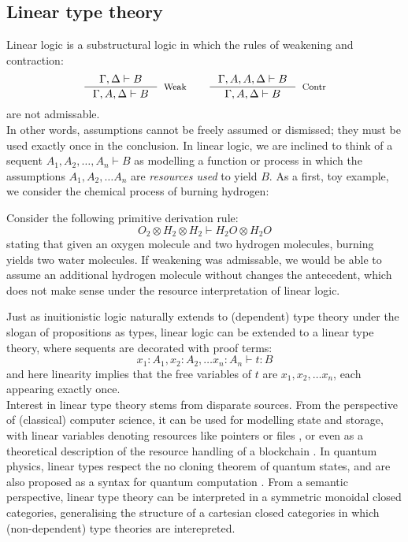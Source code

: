 \subsection{Linear type theory}
Linear logic is a substructural logic in which the rules of weakening and contraction:
\[
  \begin{split}
    \inference{\Gamma, \Delta \vdash B}{\Gamma, A, \Delta \vdash B}[Weak] \quad \quad 
    \inference{\Gamma, A, A, \Delta \vdash B}{\Gamma, A, \Delta \vdash B}[Contr]
    \end{split}
\]
are not admissable.\\
In other words, assumptions cannot be freely assumed or dismissed; they must be used exactly once in the conclusion. In linear logic, we are inclined to think of a sequent $A_1, A_2, \dots, A_n \vdash B$ as modelling a function or process in which the assumptions $A_1, A_2, \dots A_n$ are \textit{resources used} to yield $B$. As a first, toy example, we consider the chemical process of burning hydrogen:
\begin{expl}\label{burn}
Consider the following primitive derivation rule: 
\[
  O_2 \otimes H_2 \otimes H_2 \vdash H_2O \otimes H_2O
\]
stating that given an oxygen molecule and two hydrogen molecules, burning yields two water molecules. If weakening was admissable, we would be able to assume an additional hydrogen molecule without changes the antecedent, which does not make sense under the resource interpretation of linear logic.\\
\end{expl}
Just as inuitionistic logic naturally extends to (dependent) type theory under the slogan of propositions as types, linear logic can be extended to a linear type theory, where sequents are decorated with proof terms:
\[
  x_1 : A_1, x_2 : A_2, \dots x_n : A_n \vdash t : B
\]
and here linearity implies that the free variables of $t$ are $x_1, x_2, \dots x_n$, each appearing exactly once.\\
Interest in linear type theory stems from disparate sources. From the perspective of (classical) computer science, it can be used for modelling state and storage, with linear variables denoting resources like pointers or files \cite{krishnaswami}, or even as a theoretical description of the resource handling of a blockchain \cite{meredith2015linear}. In quantum physics, linear types respect the no cloning theorem of quantum states, and are also proposed as a syntax for quantum computation \cite{duncan2006types}. From a semantic perspective, linear type theory can be interpreted in a symmetric monoidal closed categories, generalising the structure of a cartesian closed categories in which (non-dependent) type theories are interepreted.\\

